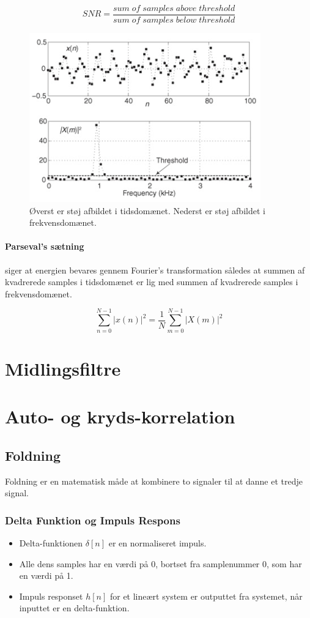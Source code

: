 \documentclass[danish]{article}
\begin{document}
\begin{equation}
SNR=  \frac{sum\;of\;samples\;above\;threshold}{sum\;of\;samples\;below\;threshold}
\end{equation}

\begin{figure} [H]
	\centering
	\includegraphics[width=0.6\linewidth]{graphics/snr}
	\caption{Øverst er støj afbildet i tidsdomænet. Nederst er støj afbildet i frekvensdomænet. }
	\label{fig:snr}
\end{figure}

\paragraph{Parseval's sætning} siger at energien bevares gennem Fourier’s transformation således at summen af kvadrerede samples i tidsdomænet er lig med summen af kvadrerede samples i frekvensdomænet.

\begin{equation}
\sum_{n=0}^{N-1}|x(n)|^2 = \frac{1}{N} \sum_{m=0}^{N-1}|X(m)|^2
\end{equation}


\newpage
\section{Midlingsfiltre}

\newpage
\section{Auto- og kryds-korrelation}
\subsection{Foldning}
Foldning er en matematisk måde at kombinere to signaler til at danne et tredje signal.
\subsubsection{Delta Funktion og Impuls Respons}
\begin{itemize}
	\item Delta-funktionen $\delta[n]$ er en normaliseret impuls.
	\item Alle dens samples har en værdi på 0, bortset fra samplenummer 0, som har en værdi på 1.
	\item Impuls responset $h[n]$ for et lineært system er outputtet fra systemet, når inputtet er en delta-funktion.
\end{itemize}
\end{document}
